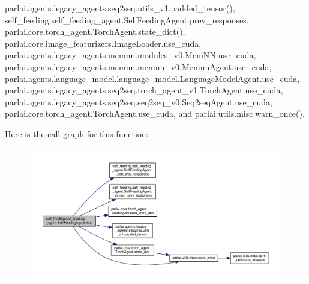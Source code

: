 parlai.\+agents.\+legacy\+\_\+agents.\+seq2seq.\+utils\+\_\+v1.\+padded\+\_\+tensor(), self\+\_\+feeding.\+self\+\_\+feeding\+\_\+agent.\+Self\+Feeding\+Agent.\+prev\+\_\+responses, parlai.\+core.\+torch\+\_\+agent.\+Torch\+Agent.\+state\+\_\+dict(), parlai.\+core.\+image\+\_\+featurizers.\+Image\+Loader.\+use\+\_\+cuda, parlai.\+agents.\+legacy\+\_\+agents.\+memnn.\+modules\+\_\+v0.\+Mem\+N\+N.\+use\+\_\+cuda, parlai.\+agents.\+legacy\+\_\+agents.\+memnn.\+memnn\+\_\+v0.\+Memnn\+Agent.\+use\+\_\+cuda, parlai.\+agents.\+language\+\_\+model.\+language\+\_\+model.\+Language\+Model\+Agent.\+use\+\_\+cuda, parlai.\+agents.\+legacy\+\_\+agents.\+seq2seq.\+torch\+\_\+agent\+\_\+v1.\+Torch\+Agent.\+use\+\_\+cuda, parlai.\+agents.\+legacy\+\_\+agents.\+seq2seq.\+seq2seq\+\_\+v0.\+Seq2seq\+Agent.\+use\+\_\+cuda, parlai.\+core.\+torch\+\_\+agent.\+Torch\+Agent.\+use\+\_\+cuda, and parlai.\+utils.\+misc.\+warn\+\_\+once().

Here is the call graph for this function\+:
\nopagebreak
\begin{figure}[H]
\begin{center}
\leavevmode
\includegraphics[width=350pt]{classself__feeding_1_1self__feeding__agent_1_1SelfFeedingAgent_a50e6f81560e522b6178f913bb3f1258a_cgraph}
\end{center}
\end{figure}
\mbox{\label{classself__feeding_1_1self__feeding__agent_1_1SelfFeedingAgent_a876feb626f411fd0a18fbce66a886764}} 
